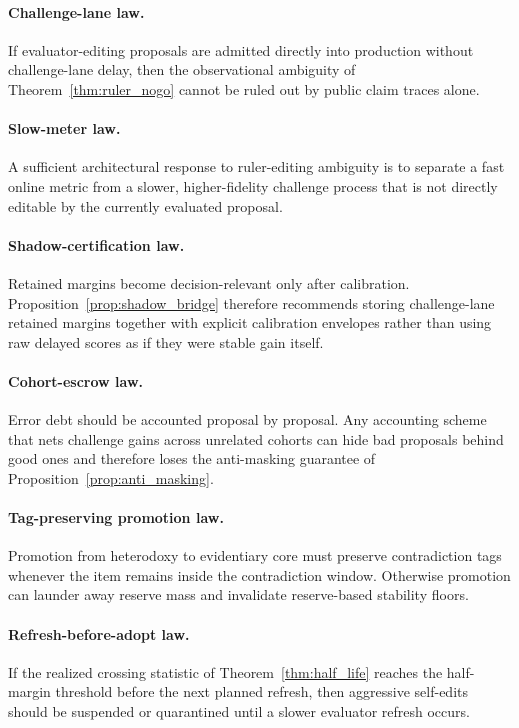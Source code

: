 \documentclass[11pt]{article}
\theoremstyle{definition}
\newcommand{\1}{\mathbf{1}}
\begin{document}
\paragraph{Challenge-lane law.}
If evaluator-editing proposals are admitted directly into production without challenge-lane delay, then the observational ambiguity of Theorem~\ref{thm:ruler_nogo} cannot be ruled out by public claim traces alone.

\paragraph{Slow-meter law.}
A sufficient architectural response to ruler-editing ambiguity is to separate a fast online metric from a slower, higher-fidelity challenge process that is not directly editable by the currently evaluated proposal.

\paragraph{Shadow-certification law.}
Retained margins become decision-relevant only after calibration. Proposition~\ref{prop:shadow_bridge} therefore recommends storing challenge-lane retained margins together with explicit calibration envelopes rather than using raw delayed scores as if they were stable gain itself.

\paragraph{Cohort-escrow law.}
Error debt should be accounted proposal by proposal. Any accounting scheme that nets challenge gains across unrelated cohorts can hide bad proposals behind good ones and therefore loses the anti-masking guarantee of Proposition~\ref{prop:anti_masking}.

\paragraph{Tag-preserving promotion law.}
Promotion from heterodoxy to evidentiary core must preserve contradiction tags whenever the item remains inside the contradiction window. Otherwise promotion can launder away reserve mass and invalidate reserve-based stability floors.

\paragraph{Refresh-before-adopt law.}
If the realized crossing statistic of Theorem~\ref{thm:half_life} reaches the half-margin threshold before the next planned refresh, then aggressive self-edits should be suspended or quarantined until a slower evaluator refresh occurs.
\end{document}
